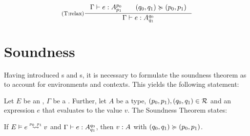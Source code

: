 \[
   \inference[(T:relax)]
   {\typing{\Gamma}{e}{\ratype{A}{p_0}{p_1}} \qquad (q_0, q_1) \relaxation (p_0, p_1)}
   {\typing{\Gamma}{e}{\ratype{A}{q_0}{q_1}}}
\]



\section{Soundness}

Having introduced s and s, it is necessary to formulate the soundness theorem as to account for environments and contexts. This yields the following statement:

\begin{theorem}\label{thm:soundness-5}
   Let \(E\) be an , \(\Gamma\) be a . Further, let \(A\) be a type, \((p_0, p_1), (q_0, q_1) \in \mathcal{R}\) and an expression \(e\) that evaluates to the value \(v\). The Soundness Theorem states:

   \begin{center}
   If \(\evals{E}{e}{v}{p_0}{p_1}\) and \(\Gamma \vdash e : A ^{q_0}_{q_1}\), then \(v : A ^{}_{}\) with \((q_0, q_1) \succcurlyeq (p_0, p_1)\).
   \end{center}
\end{theorem}

